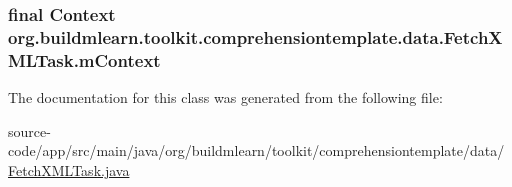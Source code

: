 \subsubsection[{\texorpdfstring{m\+Context}{mContext}}]{\setlength{\rightskip}{0pt plus 5cm}final Context org.\+buildmlearn.\+toolkit.\+comprehensiontemplate.\+data.\+Fetch\+X\+M\+L\+Task.\+m\+Context\hspace{0.3cm}{\ttfamily [private]}}\hypertarget{classorg_1_1buildmlearn_1_1toolkit_1_1comprehensiontemplate_1_1data_1_1FetchXMLTask_aef6ec23cf0a302dd409826cada59c994}{}\label{classorg_1_1buildmlearn_1_1toolkit_1_1comprehensiontemplate_1_1data_1_1FetchXMLTask_aef6ec23cf0a302dd409826cada59c994}


The documentation for this class was generated from the following file\+:\begin{DoxyCompactItemize}
\item 
source-\/code/app/src/main/java/org/buildmlearn/toolkit/comprehensiontemplate/data/\hyperlink{comprehensiontemplate_2data_2FetchXMLTask_8java}{Fetch\+X\+M\+L\+Task.\+java}\end{DoxyCompactItemize}

